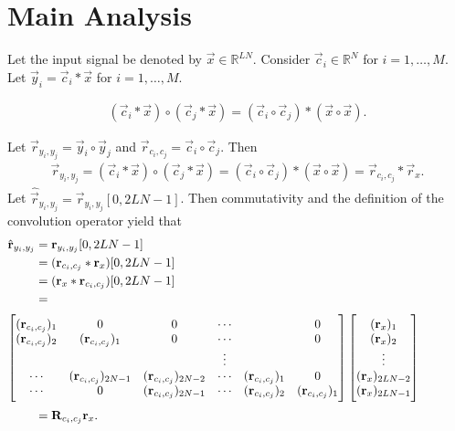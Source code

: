 \documentclass[a4paper, openany, oneside]{memoir}
\begin{document}
\section{Main Analysis}
Let the input signal be denoted by $\vec{x} \in \mathbb{R}^{LN}$. Consider $\vec{c}_i \in \mathbb{R}^{N}$ for $i = 1,\ldots,M$. Let $\vec{y}_i = \vec{c}_i \ast \vec{x}$ for $i = 1,\ldots,M$.
\begin{theorem} \label{th:conv-corr}
    \begin{align*}
        (\vec{c}_i \ast \vec{x}) \circ (\vec{c}_j \ast \vec{x}) = (\vec{c}_i \circ \vec{c}_j) \ast (\vec{x} \circ \vec{x}).
    \end{align*}
\end{theorem}
Let $\vec{r}_{y_i,y_j} = \vec{y}_i \circ \vec{y}_j$ and $\vec{r}_{c_i,c_j} = \vec{c}_i \circ \vec{c}_j$. Then
\begin{align*}
    \vec{r}_{y_i,y_j} =(\vec{c}_i \ast \vec{x}) \circ (\vec{c}_j \ast \vec{x}) = (\vec{c}_i \circ \vec{c}_j) \ast (\vec{x} \circ \vec{x}) = \vec{r}_{c_i,c_j} \ast \vec{r}_x.
\end{align*}
Let $\hat{\vec{r}}_{y_i,y_j} = \vec{r}_{y_i,y_j}[0,2LN-1]$. Then commutativity and the definition of the convolution operator yield that
\begin{align*}
    \hat{\vec{r}}_{y_i,y_j}
    &= \vec{r}_{y_i,y_j}[0,2LN-1] \\
    &= (\vec{r}_{c_i,c_j} \ast \vec{r}_x)[0,2LN-1] \\
    &= (\vec{r}_x \ast \vec{r}_{c_i,c_j})[0,2LN-1] \\
    &= \hskip \textwidth minus \textwidth \\ %
    \intertext{$\begin{bmatrix}
        (\vec{r}_{c_i,c_j})_1 & 0 & 0& \cdots & &  0 \\
        (\vec{r}_{c_i,c_j})_2 & (\vec{r}_{c_i,c_j})_1 & 0 & \cdots & & 0 \\
        &  & & \vdots &  & \\
        \cdots & (\vec{r}_{c_i,c_j})_{2N-1} & (\vec{r}_{c_i,c_j})_{2N-2} & \cdots & (\vec{r}_{c_i,c_j})_1 & 0 \\
        \cdots & 0 & (\vec{r}_{c_i,c_j})_{2N-1} & \cdots & (\vec{r}_{c_i,c_j})_2 & (\vec{r}_{c_i,c_j})_1 \\
    \end{bmatrix}
    \begin{bmatrix}
        (\vec{r}_x)_1 \\
        (\vec{r}_x)_2 \\
        \vdots \\
        (\vec{r}_x)_{2LN-2} \\
        (\vec{r}_x)_{2LN-1}
    \end{bmatrix}$}
    &= \mat{R}_{c_i,c_j} \vec{r}_x.
\end{align*}
\end{document}
